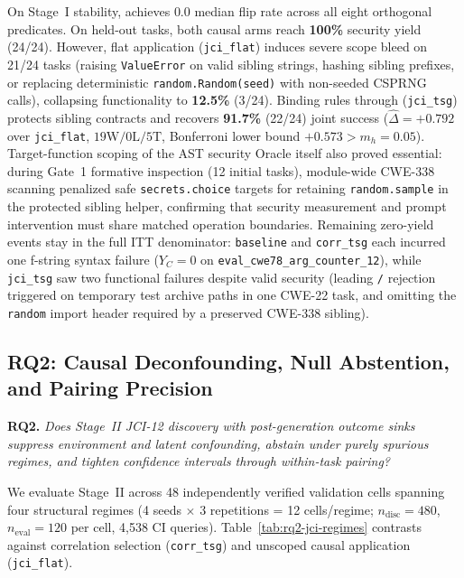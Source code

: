 On Stage~I stability, \prompttsg achieves $0.0$ median flip rate across all
eight orthogonal predicates. On held-out tasks, both causal arms reach
\textbf{100\%} security yield (24/24). However, flat application
(\texttt{jci\_flat}) induces severe scope bleed on 21/24 tasks (raising
\texttt{ValueError} on valid sibling strings, hashing sibling prefixes, or
replacing deterministic \texttt{random.Random(seed)} with non-seeded CSPRNG
calls), collapsing functionality to \textbf{12.5\%} (3/24). Binding rules
through \prompttsg (\texttt{jci\_tsg}) protects sibling contracts and recovers
\textbf{91.7\%} (22/24) joint success ($\hat{\Delta}=+0.792$ over
\texttt{jci\_flat}, $19\text{W}/0\text{L}/5\text{T}$, Bonferroni lower bound
$+0.573 > m_h=0.05$). Target-function scoping of the AST security Oracle
itself also proved essential: during Gate~1 formative inspection (12 initial
tasks), module-wide CWE-338 scanning penalized safe \texttt{secrets.choice}
targets for retaining \texttt{random.sample} in the protected sibling helper,
confirming that security measurement and prompt intervention must share matched
operation boundaries. Remaining zero-yield events stay in the full ITT
denominator: \texttt{baseline} and \texttt{corr\_tsg} each incurred one f-string
syntax failure ($Y_C=0$ on \texttt{eval\_cwe78\_arg\_counter\_12}), while
\texttt{jci\_tsg} saw two functional failures despite valid security (leading
\texttt{/} rejection triggered on temporary test archive paths in one CWE-22
task, and omitting the \texttt{random} import header required by a preserved
CWE-338 sibling).

\subsection{RQ2: Causal Deconfounding, Null Abstention, and Pairing Precision}
\label{sec:rq2}

\textbf{RQ2.} \emph{Does Stage~II JCI-12 discovery with post-generation outcome
sinks suppress environment and latent confounding, abstain under purely
spurious regimes, and tighten confidence intervals through within-task pairing?}

We evaluate Stage~II across 48 independently verified validation cells spanning
four structural regimes (4 seeds $\times$ 3 repetitions = 12 cells/regime;
$n_{\mathrm{disc}}=480$, $n_{\mathrm{eval}}=120$ per cell, 4,538 CI queries).
Table~\ref{tab:rq2-jci-regimes} contrasts \model against correlation selection
(\texttt{corr\_tsg}) and unscoped causal application (\texttt{jci\_flat}).

